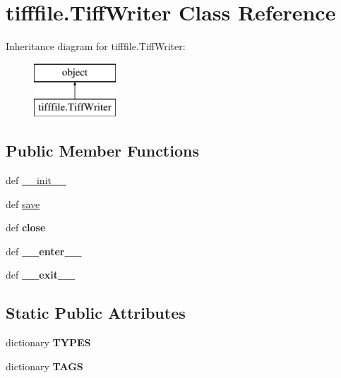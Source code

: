 \hypertarget{classtifffile_1_1TiffWriter}{\section{tifffile.\-Tiff\-Writer Class Reference}
\label{classtifffile_1_1TiffWriter}
}
Inheritance diagram for tifffile.\-Tiff\-Writer\-:\begin{figure}[H]
\begin{center}
\leavevmode
\includegraphics[height=2.000000cm]{classtifffile_1_1TiffWriter}
\end{center}
\end{figure}
\subsection*{Public Member Functions}
\begin{DoxyCompactItemize}
\item 
def \hyperlink{classtifffile_1_1TiffWriter_af9fb37461e229375ed0b7c7aa56fcf2a}{\-\_\-\-\_\-init\-\_\-\-\_\-}
\item 
def \hyperlink{classtifffile_1_1TiffWriter_a7879708dbcc972bda2148374bddbec0d}{save}
\item 
\hypertarget{classtifffile_1_1TiffWriter_a579dd794187e65874987990058ba70aa}{def {\bfseries close}}\label{classtifffile_1_1TiffWriter_a579dd794187e65874987990058ba70aa}

\item 
\hypertarget{classtifffile_1_1TiffWriter_aeb1a99b0e609acf41b4a96029397724d}{def {\bfseries \-\_\-\-\_\-enter\-\_\-\-\_\-}}\label{classtifffile_1_1TiffWriter_aeb1a99b0e609acf41b4a96029397724d}

\item 
\hypertarget{classtifffile_1_1TiffWriter_a9a746e2cea3adaab40913a74fb56ca60}{def {\bfseries \-\_\-\-\_\-exit\-\_\-\-\_\-}}\label{classtifffile_1_1TiffWriter_a9a746e2cea3adaab40913a74fb56ca60}

\end{DoxyCompactItemize}
\subsection*{Static Public Attributes}
\begin{DoxyCompactItemize}
\item 
dictionary {\bfseries T\-Y\-P\-E\-S}
\item 
dictionary {\bfseries T\-A\-G\-S}
\end{DoxyCompactItemize}


